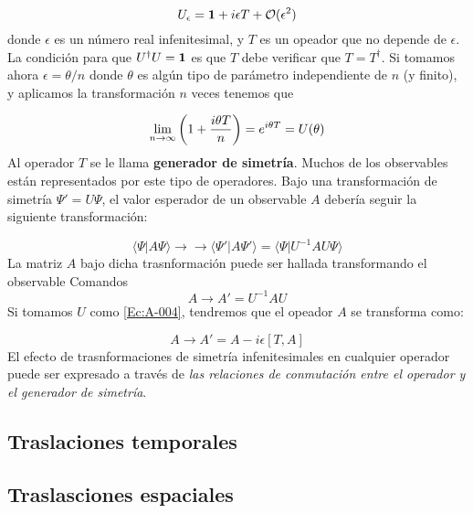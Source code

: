 \begin{equation}
    U_{\epsilon} = \mathbf{1} + i \epsilon T + \mathcal{O} (\epsilon^2) \label{Ec:A-004}
\end{equation}
donde $\epsilon$ es un número real infenitesimal, y $T$ es un opeador que no depende de $\epsilon$. La condición para que $U^{\dagger} U = \mathbf{1}$ es que $T$ debe  verificar que $T=T^{\dagger}$. Si tomamos ahora $\epsilon=\theta/n$ donde $\theta$ es algún tipo de parámetro independiente de $n$ (y finito), y aplicamos la transformación $n$ veces tenemos que

\begin{equation}
    \lim_{n\rightarrow \infty} \left( 1+ \frac{i\theta T}{n} \right) = e^{i \theta T} = U(\theta)
\end{equation}
Al operador $T$ se le llama {\bf generador de simetría}. Muchos de los observables están representados por este tipo de operadores. Bajo una transformación de simetría $\Psi'=U\Psi$, el valor esperador de un observable $A$ debería seguir la siguiente transformación:\

\begin{equation}
    \langle \Psi | A \Psi \rangle \rightarrow \rightarrow \langle \Psi' | A\Psi'\rangle = \langle \Psi | U^{-1} A U \Psi\rangle
\end{equation}
La matriz $A$ bajo dicha trasnformación puede ser hallada transformando el observable Comandos
\begin{equation}
    A \rightarrow A ' = U^{-1} A U
\end{equation}
Si tomamos $U$ como \ref{Ec:A-004}, tendremos que el opeador  $A$ se transforma como:

\begin{equation}
    A \rightarrow A' = A - i \epsilon [T,A]
\end{equation}
El efecto de trasnformaciones de simetría infenitesimales en cualquier operador puede ser expresado a través de {\it las relaciones de conmutación entre el operador y el generador de simetría}.



\subsection{Traslaciones temporales}

\subsection{Traslasciones espaciales}


